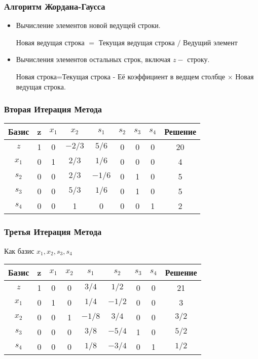 \documentclass[12pt]{beamer}
\begin{document}
\begin{frame}
	\frametitle{Алгоритм Жордана-Гаусса}
	\begin{itemize}
		\item Вычисление элементов новой ведущей строки.
		
		Новая ведущая строка $=$ Текущая ведущая строка $/$ Ведущий элемент
		\item Вычисления элементов остальных строк, включая $z-$ строку.
		
		Новая строка=Текущая строка - Её коэффициент в ведщем столбце $\times$ Новая ведущая строка.
	\end{itemize}
\end{frame}
\begin{frame}
	\frametitle{Вторая Итерация Метода}
	\begin{tabular}{|c|c|c|c|c|c|c|c|c|}
		\hline
		Базис & z  & $x_1$ & $x_2$  & $s_1$  & $s_2$  & $s_3$  & $s_4$  & Решение \\
		\hline
		$z $& 1  &  0 & ${-2}/{3}$ & ${5}/{6}$ & 0  & 0  & 0 & 20 \\
		\hline
		$x_1$& 0 & 1 & ${2}/{3}$  & ${1}/{6}$  & 0 & 0 & 0 & 4 \\
		
		$s_2$& 0 & 0 & ${2}/{3}$ & ${-1}/{6}$ & 0 & 1 & 0 & 5 \\
		
		$s_3$& 0 & 0 & ${5}/{3}$ & ${1}/{6}$ & 0 & 1 & 0 & 5 \\
		
		$s_4$& 0 & 0 & 1 & 0 & 0 & 0 & 1 & 2 \\ 
		\hline
	\end{tabular}
\end{frame}
\begin{frame}
	\frametitle{Третья Итерация Метода}
Как базис $ x_1,x_2,s_3,s_4$



\begin{tabular}{|c|c|c|c|c|c|c|c|c|}
	\hline
	Базис & z  & $x_1$ & $x_2$  & $s_1$  & $s_2$  & $s_3$  & $s_4$  & Решение \\
	\hline
	$z $& 1  &  0 & 0 & $3/4$ & $1/2$  & 0  & 0 & 21 \\
	\hline
	$x_1$& 0 & 1 & 0  & $1/4$  & $-1/2$ & 0 & 0 & 3 \\
	
	$x_2$& 0 & 0 & 1 & $-1/8$ & $3/4$ & 0 & 0 & $3/2$ \\
	
	$s_3$& 0 & 0 & 0 & $3/8$ & $-5/4$ & 1 & 0 & $5/2$ \\
	
	$s_4$& 0 & 0 & 0 & $1/8$ & $-3/4$ & 0 & 1 & $1/2$ \\ 
	\hline
\end{tabular}
\end{frame}
\end{document}
